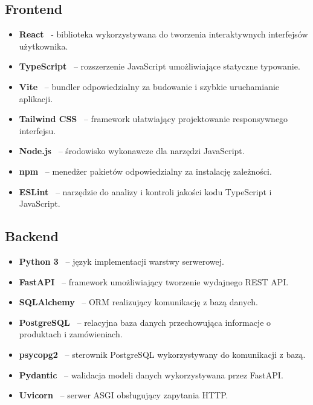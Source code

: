 \documentclass[a4paper,twoside,12pt]{book}
\begin{document}
\subsection{Frontend}

\begin{itemize}
    \item \textbf{React}~\cite{react} - biblioteka wykorzystywana do tworzenia interaktywnych interfejsów użytkownika.
    \item \textbf{TypeScript}~\cite{typescript} – rozszerzenie JavaScript umożliwiające statyczne typowanie.
    \item \textbf{Vite}~\cite{vite} – bundler odpowiedzialny za budowanie i szybkie uruchamianie aplikacji.
    \item \textbf{Tailwind CSS}~\cite{tailwind} – framework ułatwiający projektowanie responsywnego interfejsu.
    \item \textbf{Node.js}~\cite{nodejs} – środowisko wykonawcze dla narzędzi JavaScript.
    \item \textbf{npm}~\cite{npm} – menedżer pakietów odpowiedzialny za instalację zależności.
    \item \textbf{ESLint}~\cite{eslint} – narzędzie do analizy i kontroli jakości kodu TypeScript i JavaScript.
\end{itemize}

\subsection{Backend}

\begin{itemize}
    \item \textbf{Python 3}~\cite{python} – język implementacji warstwy serwerowej.
    \item \textbf{FastAPI}~\cite{fastapi} – framework umożliwiający tworzenie wydajnego REST API.
    \item \textbf{SQLAlchemy}~\cite{sqlalchemy} – ORM realizujący komunikację z bazą danych.
    \item \textbf{PostgreSQL}~\cite{postgresql} – relacyjna baza danych przechowująca informacje o produktach i zamówieniach.
    \item \textbf{psycopg2}~\cite{psycopg2} – sterownik PostgreSQL wykorzystywany do komunikacji z bazą.
    \item \textbf{Pydantic}~\cite{pydantic} – walidacja modeli danych wykorzystywana przez FastAPI.
    \item \textbf{Uvicorn}~\cite{uvicorn} – serwer ASGI obsługujący zapytania HTTP.
\end{itemize}
\end{document}
